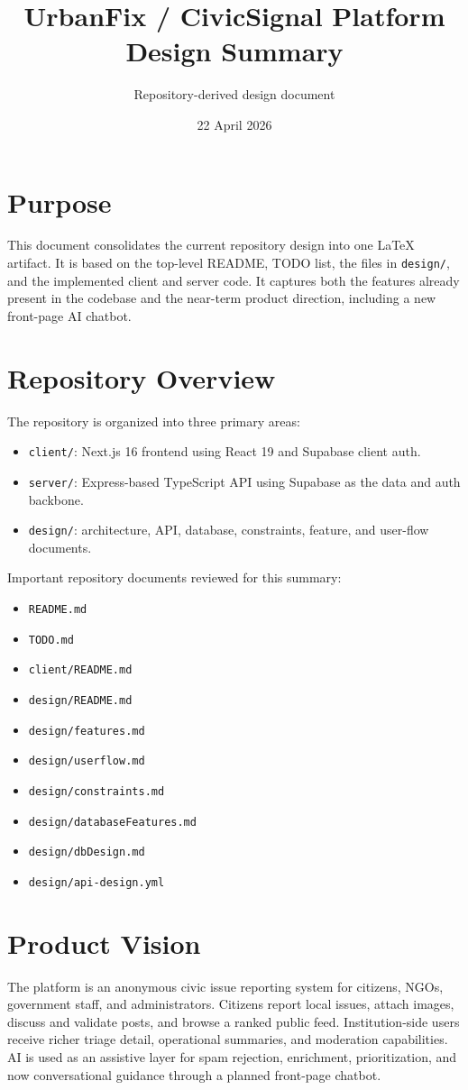 \documentclass[11pt,a4paper]{article}
\title{UrbanFix / CivicSignal Platform Design Summary}
\author{Repository-derived design document}
\date{22 April 2026}
\begin{document}
\maketitle

\section{Purpose}
This document consolidates the current repository design into one LaTeX artifact. It is based on the top-level README, TODO list, the files in \texttt{design/}, and the implemented client and server code. It captures both the features already present in the codebase and the near-term product direction, including a new front-page AI chatbot.

\section{Repository Overview}
The repository is organized into three primary areas:
\begin{itemize}
  \item \texttt{client/}: Next.js 16 frontend using React 19 and Supabase client auth.
  \item \texttt{server/}: Express-based TypeScript API using Supabase as the data and auth backbone.
  \item \texttt{design/}: architecture, API, database, constraints, feature, and user-flow documents.
\end{itemize}

Important repository documents reviewed for this summary:
\begin{itemize}
  \item \texttt{README.md}
  \item \texttt{TODO.md}
  \item \texttt{client/README.md}
  \item \texttt{design/README.md}
  \item \texttt{design/features.md}
  \item \texttt{design/userflow.md}
  \item \texttt{design/constraints.md}
  \item \texttt{design/databaseFeatures.md}
  \item \texttt{design/dbDesign.md}
  \item \texttt{design/api-design.yml}
\end{itemize}

\section{Product Vision}
The platform is an anonymous civic issue reporting system for citizens, NGOs, government staff, and administrators. Citizens report local issues, attach images, discuss and validate posts, and browse a ranked public feed. Institution-side users receive richer triage detail, operational summaries, and moderation capabilities. AI is used as an assistive layer for spam rejection, enrichment, prioritization, and now conversational guidance through a planned front-page chatbot.
\end{document}
